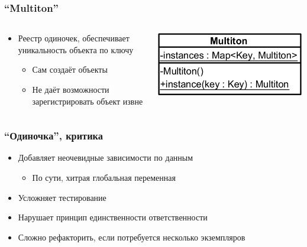 \documentclass{../../slides-style}
\begin{document}
    \begin{frame}
        \frametitle{``Multiton''}
        \begin{columns}
            \begin{column}{0.6\textwidth}
                \begin{itemize}
                    \item Реестр одиночек, обеспечивает уникальность объекта по ключу
                    \begin{itemize}
                        \item Сам создаёт объекты
                        \item Не даёт возможности зарегистрировать объект извне
                    \end{itemize}
                \end{itemize}
            \end{column}
            \begin{column}{0.4\textwidth}
                \includegraphics[width=\textwidth]{multiton.png}
            \end{column}
        \end{columns}
    \end{frame}

    \begin{frame}
        \frametitle{``Одиночка'', критика}
        \begin{itemize}
            \item Добавляет неочевидные зависимости по данным
            \begin{itemize}
                \item По сути, хитрая глобальная переменная
            \end{itemize}
            \item Усложняет тестирование
            \item Нарушает принцип единственности ответственности
            \item Сложно рефакторить, если потребуется несколько экземпляров
        \end{itemize}
    \end{frame}
\end{document}
